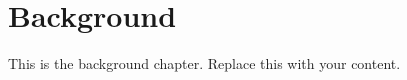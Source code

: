 \chapter{Background}\label{ch:background}

%
%
%
%

This is the background chapter. Replace this with your content.
